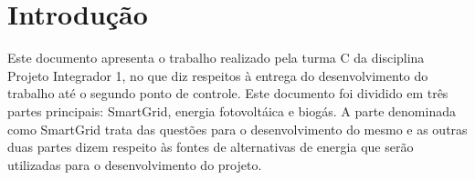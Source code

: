 \chapter*[Introdução]{Introdução}
Este documento apresenta o trabalho realizado pela turma C da disciplina Projeto Integrador 1, no que diz respeitos à entrega do desenvolvimento do trabalho até o segundo ponto de controle. Este documento foi dividido em três partes principais: SmartGrid, energia fotovoltáica e biogás. A parte denominada como SmartGrid trata das questões para o desenvolvimento do mesmo e as outras duas partes dizem respeito às fontes de alternativas de energia que serão utilizadas para o desenvolvimento do projeto.